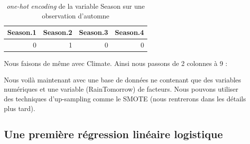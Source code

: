 \documentclass{article}
\begin{document}
\begin{table}[H]
    \centering
    \begin{tabular}{|rrrr|}
        \hline
        Season.1 & Season.2 & Season.3 & Season.4 \\
        \hline 
        0 & 1 & 0 & 0 \\
        \hline
    \end{tabular}
    \caption{\emph{one-hot encoding} de la variable Season sur une observation d'automne}
\end{table}

Nous faisons de même avec Climate. Ainsi nous passons de 2 colonnes à 9 : 

\begin{table}[ht]
    \centering
    \caption{Extrait du début des variables après \emph{one-hot encoding} des variables Season et Climate.}
\end{table}

Nous voilà maintenant avec une base de données ne contenant que des variables numériques et une variable (RainTomorrow) de facteurs. Nous pouvons utiliser des techniques d'up-sampling comme le SMOTE (nous rentrerons dans les détails plus tard).

\subsection{Une première régression linéaire logistique}
\end{document}
